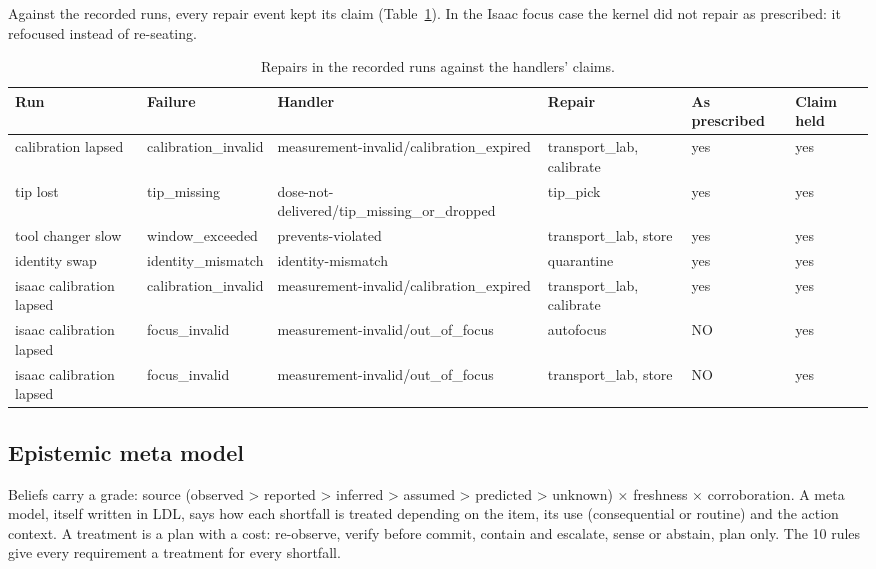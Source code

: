 \documentclass[10pt,a4paper]{article}
\begin{document}
Against the recorded runs, every repair event kept its claim (Table~\ref{tab:empirical}). In the Isaac focus case the kernel did not repair as prescribed: it refocused instead of re-seating.

\begin{table}[tbp]\centering\small
\caption{Repairs in the recorded runs against the handlers' claims.}\label{tab:empirical}
\begin{tabularx}{\linewidth}{XllXll}\toprule
\textbf{Run} & \textbf{Failure} & \textbf{Handler} & \textbf{Repair} & \textbf{As prescribed} & \textbf{Claim held} \\\midrule
calibration lapsed & calibration\_\allowbreak{}invalid & measurement-invalid/calibration\_\allowbreak{}expired & transport\_\allowbreak{}lab, calibrate & yes & yes \\
tip lost & tip\_\allowbreak{}missing & dose-not-delivered/tip\_\allowbreak{}missing\_\allowbreak{}or\_\allowbreak{}dropped & tip\_\allowbreak{}pick & yes & yes \\
tool changer slow & window\_\allowbreak{}exceeded & prevents-violated & transport\_\allowbreak{}lab, store & yes & yes \\
identity swap & identity\_\allowbreak{}mismatch & identity-mismatch & quarantine & yes & yes \\
isaac calibration lapsed & calibration\_\allowbreak{}invalid & measurement-invalid/calibration\_\allowbreak{}expired & transport\_\allowbreak{}lab, calibrate & yes & yes \\
isaac calibration lapsed & focus\_\allowbreak{}invalid & measurement-invalid/out\_\allowbreak{}of\_\allowbreak{}focus & autofocus & NO & yes \\
isaac calibration lapsed & focus\_\allowbreak{}invalid & measurement-invalid/out\_\allowbreak{}of\_\allowbreak{}focus & transport\_\allowbreak{}lab, store & NO & yes \\\bottomrule
\end{tabularx}
\end{table}

\subsection{Epistemic meta model}\label{sec:epistemic}

Beliefs carry a grade: source (observed > reported > inferred > assumed > predicted > unknown) × freshness × corroboration. A meta model, itself written in LDL, says how each shortfall is treated depending on the item, its use (consequential or routine) and the action context. A treatment is a plan with a cost: re-observe, verify before commit, contain and escalate, sense or abstain, plan only. The 10 rules give every requirement a treatment for every shortfall.
\end{document}
